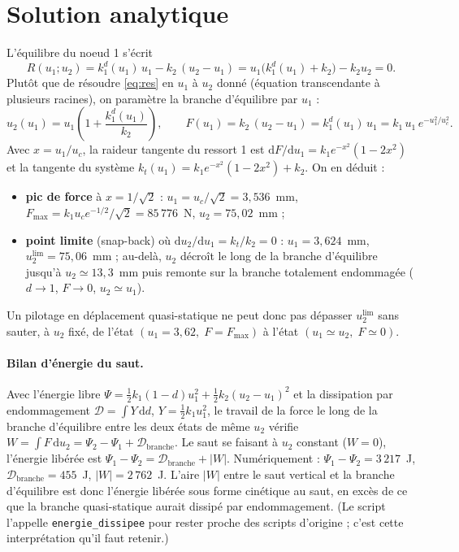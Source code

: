 \documentclass[11pt,a4paper]{article}
\newcommand{\dd}{\mathrm{d}}
\newcommand{\kd}{k_1^{d}}
\begin{document}
\section{Solution analytique}
\label{sec:ana}
L'équilibre du noeud 1 s'écrit
\begin{equation}
  R(u_1;u_2) = \kd(u_1)\,u_1 - k_2\,(u_2-u_1) = u_1\bigl(\kd(u_1)+k_2\bigr) - k_2u_2 = 0 .
  \label{eq:res}
\end{equation}
Plutôt que de résoudre \eqref{eq:res} en $u_1$ à $u_2$ donné (équation transcendante à plusieurs
racines), on paramètre la branche d'équilibre par $u_1$ :
\begin{equation}
  u_2(u_1) = u_1\left(1+\frac{\kd(u_1)}{k_2}\right),\qquad
  F(u_1) = k_2\,(u_2-u_1) = \kd(u_1)\,u_1 = k_1\,u_1\,e^{-u_1^2/u_c^2}.
  \label{eq:ana}
\end{equation}
Avec $x=u_1/u_c$, la raideur tangente du ressort 1 est $\dd F/\dd u_1 = k_1 e^{-x^2}(1-2x^2)$ et la
tangente du système $k_t(u_1) = k_1e^{-x^2}(1-2x^2)+k_2$. On en déduit :
\begin{itemize}
  \item \textbf{pic de force} à $x=1/\sqrt2$ : $u_1 = u_c/\sqrt2 = 3{,}536$~mm,
        $F_{\max} = k_1 u_c e^{-1/2}/\sqrt2 = 85\,776$~N, $u_2 = 75{,}02$~mm ;
  \item \textbf{point limite} (snap-back) où $\dd u_2/\dd u_1 = k_t/k_2 = 0$ :
        $u_1 = 3{,}624$~mm, $u_2^{\lim} = 75{,}06$~mm ; au-delà, $u_2$ décroît le long de la branche
        d'équilibre jusqu'à $u_2 \simeq 13{,}3$~mm puis remonte sur la branche totalement endommagée
        ($d\to1$, $F\to0$, $u_2\simeq u_1$).
\end{itemize}
Un pilotage en déplacement quasi-statique ne peut donc pas dépasser $u_2^{\lim}$ sans sauter, à
$u_2$ fixé, de l'état $(u_1 = 3{,}62,\;F=F_{\max})$ à l'état $(u_1\simeq u_2,\;F\simeq0)$.

\paragraph{Bilan d'énergie du saut.}
Avec l'énergie libre $\Psi = \tfrac12 k_1(1-d)u_1^2 + \tfrac12 k_2(u_2-u_1)^2$ et la dissipation par
endommagement $\mathcal D = \int Y\,\dd d$, $Y=\tfrac12 k_1u_1^2$, le travail de la force le long de
la branche d'équilibre entre les deux états de même $u_2$ vérifie
$W = \int F\,\dd u_2 = \Psi_2-\Psi_1+\mathcal D_{\text{branche}}$. Le saut se faisant à $u_2$
constant ($W=0$), l'énergie libérée est $\Psi_1-\Psi_2 = \mathcal D_{\text{branche}} + |W|$.
Numériquement : $\Psi_1-\Psi_2 = 3\,217$~J, $\mathcal D_{\text{branche}} = 455$~J,
$|W| = 2\,762$~J. L'aire $|W|$ entre le saut vertical et la branche d'équilibre est donc l'énergie
libérée sous forme cinétique au saut, en excès de ce que la branche quasi-statique aurait dissipé
par endommagement. (Le script l'appelle \texttt{energie\_dissipee} pour rester proche des scripts
d'origine ; c'est cette interprétation qu'il faut retenir.)
\end{document}
